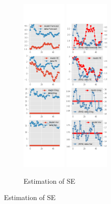 \documentclass[]{article}
\begin{document}
\begin{figure}[ht]
	\centering
	\begin{subfigure}[b]{\textwidth}
		\centering
		\caption{Estimation of SE}
		\label{SE_diag_SCE}
		\includegraphics[width=0.24\textwidth]{figures/sce_se_est_diag0.png}
		\includegraphics[width=0.24\textwidth]{figures/sce_se_est_diag1.png}

\end{subfigure}
\end{figure}
\end{document}
